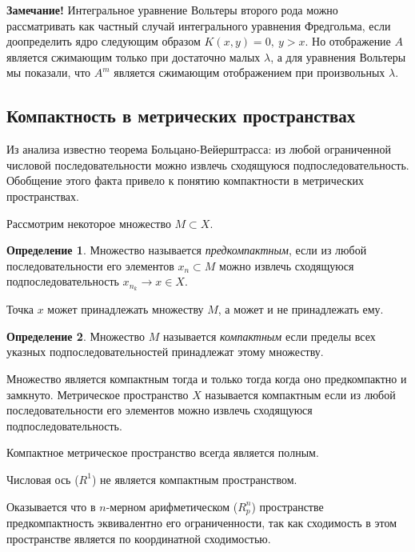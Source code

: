 \documentclass[14pt,a4paper]{extarticle}
\theoremstyle{definition}
\newtheorem{definition}{Определение}[section]
\theoremstyle{remark}
\renewcommand{\[}{\begin{dmath*}[compact]}
\renewcommand{\]}{\end{dmath*}}
\newcommand{\sep}{ , \ \allowbreak }
\begin{document}
\textbf{Замечание!} Интегральное уравнение Вольтеры второго рода можно
рассматривать как частный случай интегрального уравнения Фредгольма,
если доопределить ядро следующим образом $K(x,y)=0\sep y>x$.
Но отображение $A$ является сжимающим только при достаточно малых $\lambda$,
а для уравнения Вольтеры мы показали, что $A^m$ является сжимающим отображением
при произвольных $\lambda$.

\subsection{Компактность в метрических пространствах}

Из анализа известно теорема Больцано-Вейерштрасса:
из любой ограниченной числовой последовательности можно извлечь
сходящуюся подпоследовательность.
Обобщение этого факта привело к понятию компактности
в метрических пространствах.

Рассмотрим некоторое множество $M \subset X$.

\begin{definition}
  Множество называется \textit{предкомпактным},
  если из любой последовательности его элементов ${x_n} \subset M$
  можно извлечь сходящуюся подпоследовательность $x_{n_k} \to x \in X$.
\end{definition}

Точка $x$ может принадлежать множеству $M$, а может и не принадлежать ему.

\begin{definition}
  Множество $M$ называется \textit{компактным} если пределы всех указных
  подпоследовательностей принадлежат этому множеству.
\end{definition}

Множество является компактным тогда и только тогда когда оно
предкомпактно и замкнуто.
Метрическое пространство $X$ называется компактным если из любой
последовательности его элементов можно извлечь сходящуюся подпоследовательность.

Компактное метрическое пространство всегда является полным.

Числовая ось ($R^1$) не является компактным пространством. %


Оказывается что в $n$-мерном арифметическом ($R_p^n$) пространстве
предкомпактность эквивалентно его ограниченности,
так как сходимость в этом пространстве является по координатной сходимостью.
\end{document}
